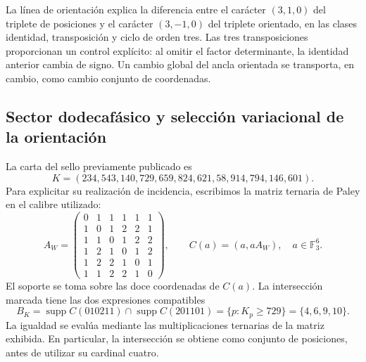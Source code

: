 La línea de orientación explica la diferencia entre el carácter
\((3,1,0)\) del triplete de posiciones y el carácter \((3,-1,0)\)
del triplete orientado, en las clases identidad, transposición y ciclo de
orden tres. Las tres transposiciones proporcionan un control explícito:
al omitir el factor determinante, la identidad anterior cambia de signo.
Un cambio global del ancla orientada se transporta, en cambio, como cambio
conjunto de coordenadas.

\subsection{Sector dodecafásico y selección variacional de la orientación}

La carta del sello previamente publicado es
\begin{equation}
 K=(234,543,140,729,659,824,621,58,914,794,146,601).
 \label{ii:eq:ii-witt-K-marked}
\end{equation}
Para explicitar su realización de incidencia, escribimos la matriz ternaria
de Paley en el calibre utilizado:
\[
 A_W=\begin{pmatrix}
 0&1&1&1&1&1\\
 1&0&1&2&2&1\\
 1&1&0&1&2&2\\
 1&2&1&0&1&2\\
 1&2&2&1&0&1\\
 1&1&2&2&1&0
 \end{pmatrix},
 \qquad C(a)=(a,aA_W),\quad a\in\mathbb F_3^6.
\]
El soporte se toma sobre las doce coordenadas de \(C(a)\). La
intersección marcada tiene las dos expresiones compatibles
\begin{equation}
 B_K=\operatorname{supp}C(010211)\cap\operatorname{supp}C(201101)
     =\{p:K_p\ge729\}=\{4,6,9,10\}.
 \label{ii:eq:ii-witt-B-marked}
\end{equation}
La igualdad se evalúa mediante las multiplicaciones ternarias de la matriz
exhibida. En particular, la intersección se obtiene como conjunto de
posiciones, antes de utilizar su cardinal cuatro.

